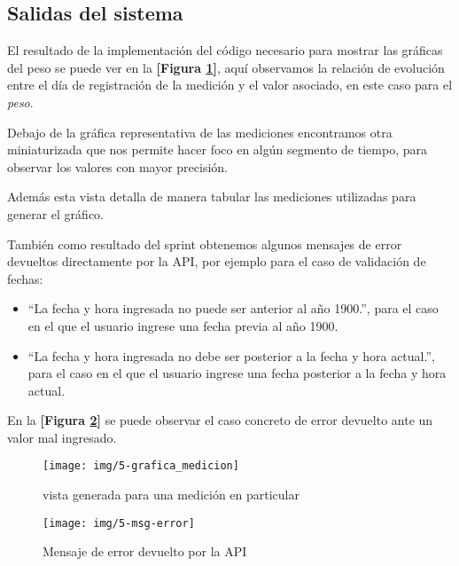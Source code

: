 \subsection{Salidas del sistema}

El resultado de la implementación del código necesario para mostrar las gráficas del peso se puede ver en la \textbf{[Figura \ref{5-grafica_medicion}]}, aquí observamos la relación de evolución entre el día de registración de la medición y el valor asociado, en este caso para el \textit{peso}.

Debajo de la gráfica representativa de las mediciones encontramos otra miniaturizada que nos permite hacer foco en algún segmento de tiempo, para observar los valores con mayor precisión.

Además esta vista detalla de manera tabular las mediciones utilizadas para generar el gráfico.

También como resultado del sprint obtenemos algunos mensajes de error devueltos directamente por la API, por ejemplo para el caso de validación de fechas:

\begin{itemize}
	\item ``La fecha y hora ingresada no puede ser anterior al año 1900.'', para el caso en el que el usuario ingrese una fecha previa al año 1900.
	\item ``La fecha y hora ingresada no debe ser posterior a la fecha y hora actual.'', para el caso en el que el usuario ingrese una fecha posterior a la fecha y hora actual.
\end{itemize}

En la \textbf{[Figura \ref{5-msg-error}]} se puede observar el caso concreto de error devuelto ante un valor mal ingresado.

\begin{figure}[h!]
	\centering
	\texttt{[image: img/5-grafica\_medicion]}
	\caption{vista generada para una medición en particular}
	\label{5-grafica_medicion}
\end{figure}

\begin{figure}[h!]
	\centering
	\texttt{[image: img/5-msg-error]}
	\caption{Mensaje de error devuelto por la API}
	\label{5-msg-error}
\end{figure}

\clearpage









